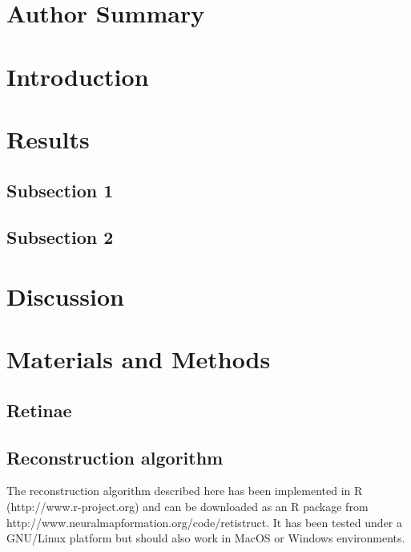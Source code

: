 \documentclass[10pt]{article}
\begin{document}
\section*{Author Summary}

\section*{Introduction}

\section*{Results}

\subsection*{Subsection 1}

\subsection*{Subsection 2}

\section*{Discussion}

\section*{Materials and Methods}
\label{retistruct_plos:sec:materials-methods}

\subsection*{Retinae}
\label{retistruct_plos:sec:retinae}


\subsection*{Reconstruction algorithm}
\label{retistruct_plos:sec:reconstr-algor}

The reconstruction algorithm described here has been implemented in R
(http://www.r-project.org) and can be downloaded as an R package from
http://www.neuralmapformation.org/code/retistruct. It has been tested
under a GNU/Linux platform but should also work in MacOS or Windows
environments.
\end{document}
